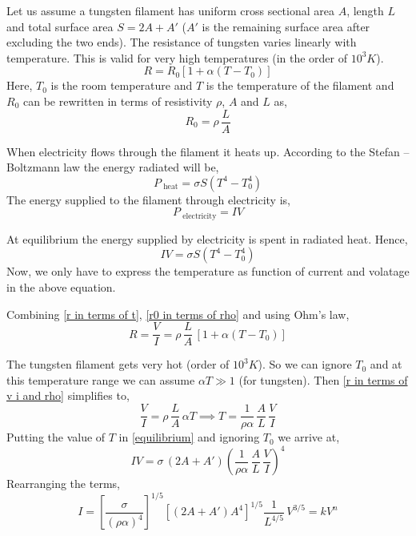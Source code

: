 \documentclass[titlepage, a4paper, 11pt]{article}
\begin{document}
Let us assume a tungsten filament has uniform cross sectional area $A$, length $L$ and total surface
area $S = 2A + A'$ ($A'$ is the remaining surface area after excluding the two ends). The resistance
of tungsten varies linearly with temperature. This is valid for very high temperatures (in the order
of $10^3K$).
\begin{equation}
	R = R_0 [1 + \alpha (T - T_0)]
	\label{r in terms of t}
\end{equation}
Here, $T_0$ is the room temperature and $T$ is the temperature of the filament and $R_0$ can be
rewritten in terms of resistivity $\rho$, $A$ and $L$ as,
\begin{equation}
	R_0 = \rho \, \frac{L}{A}
	\label{r0 in terms of rho}
\end{equation}

When electricity flows through the filament it heats up. According to the Stefan – Boltzmann law the
energy radiated will be,
\begin{equation}
	P_\text{ heat} = \sigma S (T^4 - T_0^4)
	\label{p heat}
\end{equation}
The energy supplied to the filament through electricity is,
\begin{equation}
	P_\text{ electricity} = I V
	\label{p electricity}
\end{equation}

At equilibrium the energy supplied by electricity is spent in radiated heat. Hence,
\begin{equation}
	I V = \sigma S (T^4 - T_0^4)
	\label{equilibrium}
\end{equation}
Now, we only have to express the temperature as function of current and volatage in the above
equation.

Combining \eqref{r in terms of t}, \eqref{r0 in terms of rho} and using Ohm's law,
\begin{equation}
	R = \frac{V}{I} = \rho \, \frac{L}{A} \, [1 + \alpha (T - T_0)]
	\label{r in terms of v i and rho}
\end{equation}

The tungsten filament gets very hot (order of $10^3K$). So we can ignore $T_0$ and at this
temperature range we can assume $\alpha T \gg 1$ (for tungsten). Then
\eqref{r in terms of v i and rho} simplifies to,
\begin{equation}
	\frac{V}{I} = \rho \, \frac{L}{A} \, \alpha T \implies T = \frac{1}{\rho \alpha} \, \frac{A}{L}
	\, \frac{V}{I}
\end{equation}
Putting the value of $T$ in \eqref{equilibrium} and ignoring $T_0$ we arrive at,
\begin{equation}
	I V = \sigma \, (2A + A') \left( \frac{1}{\rho \alpha} \, \frac{A}{L} \, \frac{V}{I} \right)^4
\end{equation}
Rearranging the terms,
\begin{equation}
	I = \left[ \frac{\sigma}{(\rho \alpha)^4} \right]^{1/5} \left[ (2A + A') A^4 \right]^{1/5}
	\frac{1}{L^{4/5}} \, V^{3/5} = k V^n
	\label{i = kv^n}
\end{equation}
\end{document}
